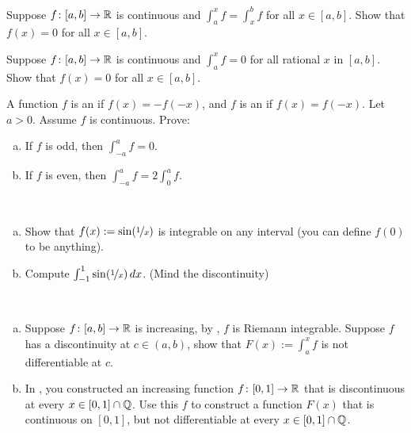 \begin{exercise}
Suppose $f \colon [a,b] \to {\mathbb{R}}$ is continuous and
$\int_a^x f = \int_x^b f$ for all $x \in [a,b]$.  Show that $f(x) = 0$
for all $x \in [a,b]$.
\end{exercise}

\begin{exercise}
Suppose $f \colon [a,b] \to {\mathbb{R}}$ is continuous and
$\int_a^x f = 0$ for all rational $x$ in $[a,b]$.  Show that $f(x) = 0$
for all $x \in [a,b]$.
\end{exercise}

\begin{samepage}
\begin{exercise}
A function $f$ is an \emph{} if $f(x) = -f(-x)$,
and $f$ is an \emph{} if $f(x) = f(-x)$.  Let $a >
0$.  Assume $f$ is continuous.  Prove:
\begin{enumerate}[a)]
\item
If $f$ is odd, then $\int_{-a}^a f = 0$.
\item
If $f$ is even, then $\int_{-a}^a f = 2 \int_0^a f$.
\end{enumerate}
\end{exercise}
\end{samepage}

\begin{exercise}
{\ }
\begin{enumerate}[a)]
\item
Show that $f(x) := \sin(\nicefrac{1}{x})$
is integrable on any interval (you can define $f(0)$ to be anything).
\item
Compute $\int_{-1}^1 \sin(\nicefrac{1}{x})\,dx$.  (Mind the
discontinuity)
\end{enumerate}
\end{exercise}

\begin{exercise}
{\ }
\begin{enumerate}[a)]
\item
Suppose $f \colon [a,b] \to {\mathbb{R}}$ is increasing, by
,
$f$ is Riemann integrable.  Suppose $f$ has a discontinuity at $c \in
(a,b)$, show that $F(x) := \int_a^x f$ is not differentiable at $c$.
\item
In , you constructed an increasing
function $f \colon [0,1] \to {\mathbb{R}}$ that is discontinuous at every
$x \in [0,1] \cap {\mathbb{Q}}$.  Use this $f$ to construct a function $F(x)$ that is
continuous on $[0,1]$, but not differentiable at every $x \in [0,1] \cap {\mathbb{Q}}$.
\end{enumerate}
\end{exercise}

